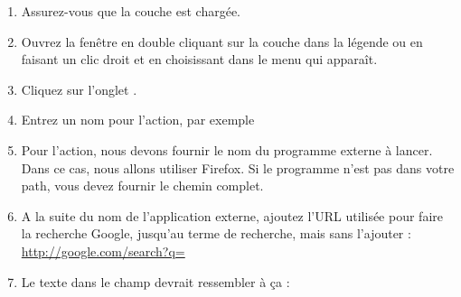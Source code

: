 \begin{enumerate}
\item Assurez-vous que la couche  est chargée.
\item Ouvrez la fenêtre  en double cliquant sur la couche dans la légende ou en faisant un clic droit et en choisissant  dans le menu qui apparaît.
\item Cliquez sur l'onglet .
\item Entrez un nom pour l'action, par exemple 
\item Pour l'action, nous devons fournir le nom du programme externe à lancer. Dans ce cas, nous allons utiliser Firefox. Si le programme n'est pas dans votre path, vous devez fournir le chemin complet.
\item A la suite du nom de l'application externe, ajoutez l'URL utilisée pour faire la recherche Google, jusqu'au terme de recherche, mais sans l'ajouter : \url{http://google.com/search?q=}
\item Le texte dans le champ  devrait ressembler à ça :\\

\end{enumerate}
